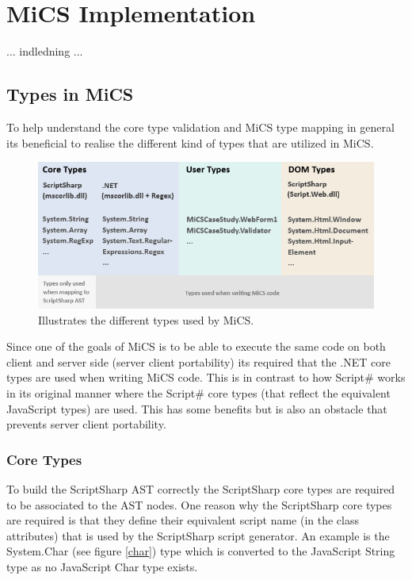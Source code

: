 \chapter{MiCS Implementation}
	... indledning ...



\section{Types in MiCS} %
\label{sec:types_in_mics}
	To help understand the core type validation and MiCS type mapping in general its beneficial to realise the different kind of types that are utilized in MiCS.

	\begin{figure}[H]
		\begin{center}
			\centerline{\includegraphics[width=16cm]{resources/images/TypesOverview.png}}
		\end{center}
		\caption{Illustrates the different types used by MiCS.}
		\label{typesOverview}
	\end{figure}

	Since one of the goals of MiCS is to be able to execute the same code on both client and server side (server client portability) its required that the .NET core types are used when writing MiCS code. This is in contrast to how Script\# works in its original manner where the Script\# core types (that reflect the equivalent JavaScript types) are used. This has some benefits but is also an obstacle that prevents server client portability.

	\subsection{Core Types} %
	\label{sub:core_types}
		To build the ScriptSharp AST correctly the ScriptSharp core types are required to be associated to the AST nodes. One reason why the ScriptSharp core types are required is that they define their equivalent script name (in the class attributes) that is used by the ScriptSharp script generator. An example is the System.Char (see figure \ref{char}) type which is converted to the JavaScript String type as no JavaScript Char type exists.

